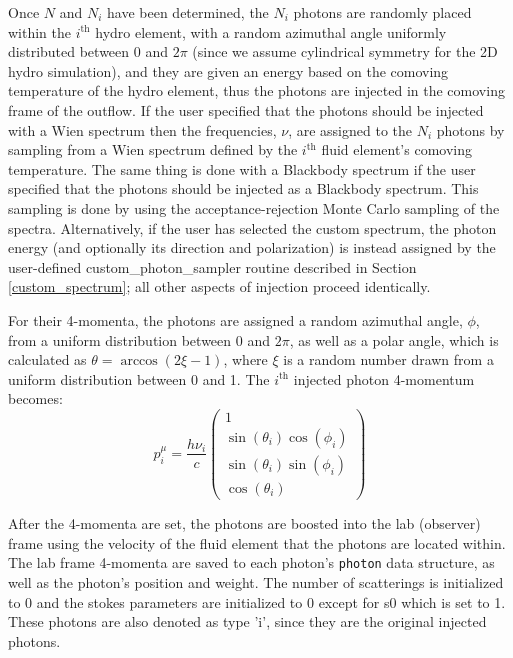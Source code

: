 \documentclass[12pt,a4paper]{article}
\begin{document}
Once $N$ and $N_i$ have been determined, the $N_i$ photons are randomly placed within the $i^\mathrm{th}$ hydro element, with a random azimuthal angle uniformly distributed between $0$ and $2\pi$ (since we assume cylindrical symmetry for the 2D hydro simulation), and they are given an energy based on the comoving temperature of the hydro element, thus the photons are injected in the comoving frame of the outflow. If the user specified that the photons should be injected with a Wien spectrum then the frequencies, $\nu$, are assigned to the $N_i$ photons by sampling from a Wien spectrum defined by the $i^\mathrm{th}$ fluid element's comoving temperature. The same thing is done with a Blackbody spectrum if the user specified that the photons should be injected as a Blackbody spectrum. This sampling is done by using the acceptance-rejection Monte Carlo sampling of the spectra. Alternatively, if the user has selected the custom spectrum, the photon energy (and optionally its direction and polarization) is instead assigned by the user-defined custom\_photon\_sampler routine described in Section \ref{custom_spectrum}; all other aspects of injection proceed identically.

For their 4-momenta, the photons are assigned a random azimuthal angle, $\phi$, from a uniform distribution between $0$ and $2\pi$, as well as a polar angle, which is calculated as $\theta=\arccos(2\xi-1)$, where $\xi$ is a random number drawn from a uniform distribution between 0 and 1. The $i^\mathrm{th}$ injected photon 4-momentum becomes:
\[
p^\mu_i=\frac{h\nu_i}{c}\begin{pmatrix}
1 \\ \sin(\theta_i) \cos(\phi_i) \\ \sin(\theta_i) \sin(\phi_i) \\ \cos(\theta_i)
\end{pmatrix}
\]

After the 4-momenta are set, the photons are boosted into the lab (observer) frame using the velocity of the fluid element that the photons are located within. The lab frame 4-momenta are saved to each photon's \texttt{photon} data structure, as well as the photon's position and weight. The number of scatterings is initialized to 0 and the stokes parameters are initialized to 0 except for s0 which is set to 1. These photons are also denoted as type 'i', since they are the original injected photons.
\end{document}
